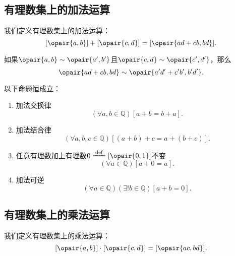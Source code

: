 \subsection{有理数集上的加法运算}
我们定义有理数集上的加法运算：
\begin{equation}\label{equation:集合论.有理数集上的加法运算}
	[\opair{a,b}]+[\opair{c,d}]=[\opair{ad+cb,bd}].
\end{equation}

\begin{lemma}\label{theorem:集合论.有理数集上的加法运算是良定的}
如果\(\opair{a,b}\sim\opair{a',b'}\)且\(\opair{c,d}\sim\opair{c',d'}\)，那么\[
	\opair{ad+cb,bd}\sim\opair{a'd'+c'b',b'd'}.
\]
\end{lemma}

\begin{theorem}\label{theorem:集合论.有理数加法的运算法则}
以下命题恒成立：
\begin{enumerate}
	\item 加法交换律
	\begin{equation}\label{equation:集合论.有理数加法交换律}
		(\forall a,b\in\mathbb{Q})[a+b=b+a].
	\end{equation}
	\item 加法结合律
	\begin{equation}\label{equation:集合论.有理数加法结合律}
		(\forall a,b,c\in\mathbb{Q})[(a+b)+c=a+(b+c)].
	\end{equation}
	\item 任意有理数加上有理数\(0\defeq[\opair{0,1}]\)不变
	\begin{equation}\label{equation:集合论.任意有理数加上零不变}
		(\forall a\in\mathbb{Q})[a+0=a].
	\end{equation}
	\item 加法可逆
	\begin{equation}\label{equation:集合论.有理数加法可逆}
		(\forall a\in\mathbb{Q})(\exists!b\in\mathbb{Q})[a+b=0].
	\end{equation}
\end{enumerate}
\end{theorem}

\subsection{有理数集上的乘法运算}
我们定义有理数集上的乘法运算：
\begin{equation}\label{equation:集合论.有理数集上的乘法运算}
	[\opair{a,b}]\cdot[\opair{c,d}]=[\opair{ac,bd}].
\end{equation}

